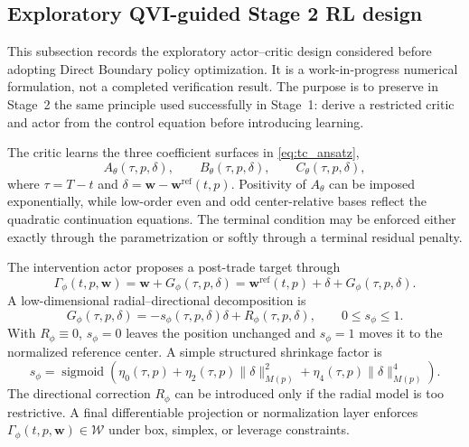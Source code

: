 \documentclass[a4paper,10pt]{article}
\newcommand{\bw}{\bm{w}}
\begin{document}
\subsection{Exploratory QVI-guided Stage 2 RL design}
\label{sec:working_qvi_rl}

This subsection records the exploratory actor--critic design considered before adopting Direct Boundary policy optimization. It is a work-in-progress numerical formulation, not a completed verification result. The purpose is to preserve in Stage~2 the same principle used successfully in Stage~1: derive a restricted critic and actor from the control equation before introducing learning.

The critic learns the three coefficient surfaces in \eqref{eq:tc_ansatz},
\begin{equation}
A_\theta(\tau,p,\delta),\qquad
B_\theta(\tau,p,\delta),\qquad
C_\theta(\tau,p,\delta),
\end{equation}
where $\tau=T-t$ and $\delta=\bw-\bw^{\mathrm{ref}}(t,p)$. Positivity of $A_\theta$ can be imposed exponentially, while low-order even and odd center-relative bases reflect the quadratic continuation equations. The terminal condition may be enforced either exactly through the parametrization or softly through a terminal residual penalty.

The intervention actor proposes a post-trade target through
\begin{equation}
\Gamma_\phi(t,p,\bw)
=\bw+G_\phi(\tau,p,\delta)
=\bw^{\mathrm{ref}}(t,p)+\delta+G_\phi(\tau,p,\delta).
\label{eq:qvi_intervention_actor}
\end{equation}
A low-dimensional radial--directional decomposition is
\begin{equation}
G_\phi(\tau,p,\delta)
=-s_\phi(\tau,p,\delta)\delta
+R_\phi(\tau,p,\delta),
\qquad 0\le s_\phi\le1.
\label{eq:radial_directional_actor}
\end{equation}
With $R_\phi\equiv0$, $s_\phi=0$ leaves the position unchanged and $s_\phi=1$ moves it to the normalized reference center. A simple structured shrinkage factor is
\begin{equation}
s_\phi
=\operatorname{sigmoid}\left(
\eta_0(\tau,p)
+\eta_2(\tau,p)\|\delta\|_{M(p)}^2
+\eta_4(\tau,p)\|\delta\|_{M(p)}^4
\right).
\end{equation}
The directional correction $R_\phi$ can be introduced only if the radial model is too restrictive. A final differentiable projection or normalization layer enforces $\Gamma_\phi(t,p,\bw)\in\mathcal W$ under box, simplex, or leverage constraints.
\end{document}

